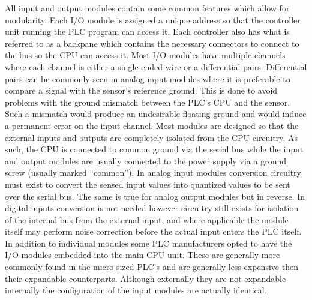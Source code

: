 All input and output modules contain some common  features which allow for modularity. 
Each I/O module is assigned a unique address so that the controller unit running the 
PLC program can access it. Each controller also has what is referred to as a backpane 
which contains the necessary connectors to connect to the bus so the CPU can access it.
Most I/O modules have multiple channels where each channel is either a single ended wire 
or a differential pairs. Differential pairs can be commonly seen in analog input modules
where it is preferable to compare a signal with the sensor's reference ground. This is 
done to avoid problems with the ground mismatch between the PLC's CPU and the sensor. 
Such a mismatch would produce an undesirable floating ground and would induce a permanent 
error on the input channel. Most modules are designed so that the external inputs and 
outputs are completely isolated from the CPU circuitry. As such, the CPU is connected 
to common ground via the serial bus while the input and output modules are usually connected 
to the power supply via a ground screw (usually marked ``common''). In analog input 
modules conversion circuitry must exist to convert the sensed input values into quantized 
values to be sent over the serial bus. The same is true for analog output modules but 
in reverse. In digital inputs conversion is not needed however circuitry still exists 
for isolation of the internal bus from the external input, and where applicable the 
module itself may perform noise correction before the actual input enters the PLC itself. 
In addition to individual modules some PLC manufacturers opted to have the I/O modules 
embedded into the main CPU unit. These are generally more commonly found in the micro 
sized PLC's and are generally less expensive then their expandable counterparts. 
Although externally they are not expandable internally the configuration of the input 
modules are actually identical.

